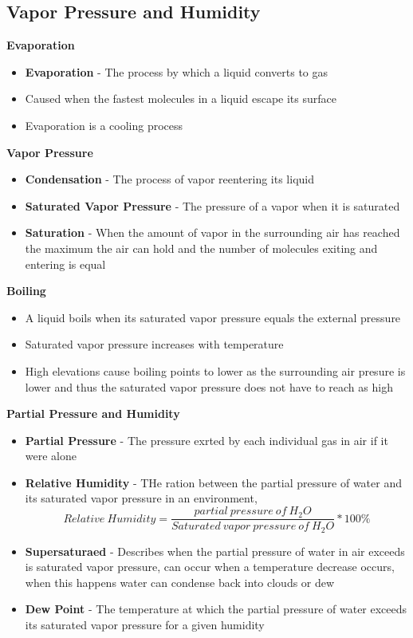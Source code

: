 \subsection{Vapor Pressure and Humidity}

\textbf{Evaporation}
\begin{itemize}
    \item \textbf{Evaporation} - The process by which a liquid converts to gas
    \item Caused when the fastest molecules in a liquid escape its surface
    \item Evaporation is a cooling process
\end{itemize}

\textbf{Vapor Pressure}
\begin{itemize}
    \item \textbf{Condensation} - The process of vapor reentering its liquid
    \item \textbf{Saturated Vapor Pressure} - The pressure of a vapor when it is saturated
    \item \textbf{Saturation} - When the amount of vapor in the surrounding air has reached the maximum the air can hold and the number of molecules exiting and entering is equal
\end{itemize}

\textbf{Boiling}
\begin{itemize}
    \item A liquid boils when its saturated vapor pressure equals the external pressure
    \item Saturated vapor pressure increases with temperature
    \item High elevations cause boiling points to lower as the surrounding air presure is lower and thus the saturated vapor pressure does not have to reach as high
\end{itemize}

\textbf{Partial Pressure and Humidity}
\begin{itemize}
    \item \textbf{Partial Pressure} - The pressure exrted by each individual gas in air if it were alone
    \item \textbf{Relative Humidity} - THe ration between the partial pressure of water and its saturated vapor pressure in an environment, \[Relative\ Humidity=\frac{partial\ pressure\ of\ H_2O}{Saturated\ vapor\ pressure\ of\ H_2O}*100\%\]
    \item \textbf{Supersaturaed} - Describes when the partial pressure of water in air exceeds is saturated vapor pressure, can occur when a temperature decrease occurs, when this happens water can condense back into clouds or dew
    \item \textbf{Dew Point} - The temperature at which the partial pressure of water exceeds its saturated vapor pressure for a given humidity
\end{itemize}

